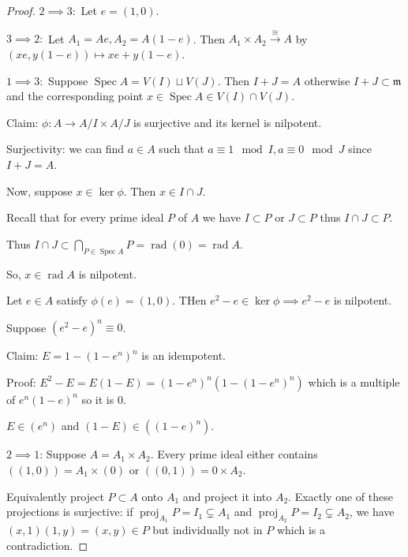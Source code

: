 \documentclass{article}
\theoremstyle{definition}
\begin{document}
    \begin{proof}
        \(2 \implies 3:\) Let \(e = (1,0)\).
        
        \(3 \implies 2:\) Let \(A_1 = A e, A_2 = A(1-e)\). Then \(A_1 \times A_2 \xrightarrow{\cong} A\) by \((xe, y(1-e)) \mapsto xe + y(1-e)\).
        
        \(1 \implies 3:\) Suppose \(\operatorname{Spec} A = V(I) \sqcup V(J)\). Then \(I + J = A\) otherwise \(I + J \subset \mathfrak{m}\) and the corresponding point \(x \in \operatorname{Spec} A \in V(I) \cap V(J)\).

        Claim: \(\phi : A \to A / I \times A / J\) is surjective and its kernel is nilpotent.

        Surjectivity: we can find \(a\in A\) such that \(a \equiv 1 \mod I, a \equiv 0 \mod J\) since \(I + J = A\).

        Now, suppose \(x\in \ker \phi\). Then \(x\in I \cap J\).

        Recall that for every prime ideal \(P\) of \(A\) we have \(I \subset P\) or \(J \subset P\) thus \(I \cap J \subset P\).

        Thus \(I \cap J \subset \bigcap_{P \in \operatorname{Spec} A} P = \operatorname{rad} (0) = \operatorname{rad} A\).
        
        So, \(x\in \operatorname{rad} A\) is nilpotent.

        Let \(e\in A\) satisfy \(\phi(e) = (1,0)\). THen \(e^2 - e \in \ker \phi \implies e^2 - e\) is nilpotent.

        Suppose \((e^2 - e)^n \equiv  0\).

        Claim: \(E = 1-(1-e^n)^n\) is an idempotent.

        Proof: \(E^2 - E = E(1-E) = (1-e^n)^n(1-(1-e^n)^n)\) which is a multiple of \(e^n(1-e)^n\) so it is \(0\).
        
        \(E \in (e^n)\) and \((1-E) \in ((1-e)^n)\).

        \(2 \implies 1\): Suppose \(A = A_1 \times A_2\). Every prime ideal either contains \(((1,0)) = A_1 \times (0)\) or \(((0,1)) = 0 \times A_2\).

        Equivalently project \(P \subset A\) onto \(A_1\) and project it into \(A_2\). Exactly one of these projections is surjective: if \(\operatorname{proj}_{A_1} P = I_1 \subsetneq A_1\) and \(\operatorname{proj}_{A_2} P = I_2  \subsetneq A_2\), we have \((x,1)(1,y) = (x,y) \in P\) but individually not in \(P\) which is a contradiction.
    \end{proof}
\end{document}
